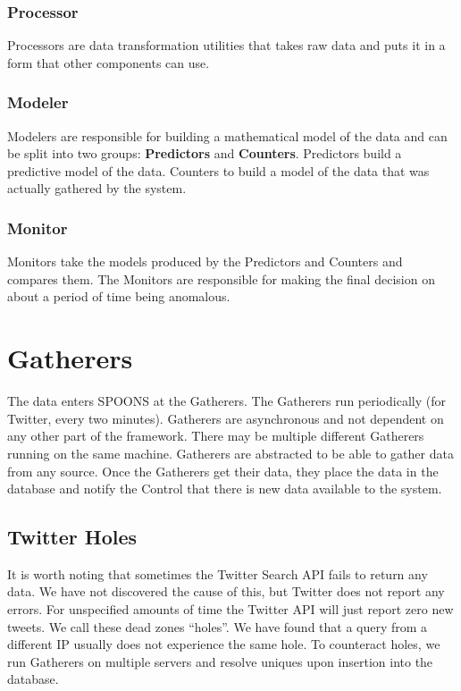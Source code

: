 \documentclass[12pt]{ucthesis}
\begin{document}
\subsubsection{Processor}
Processors are data transformation utilities that takes raw data and puts it in a form that other components can use.

\subsubsection{Modeler}
Modelers are responsible for building a mathematical model of the data and can be split into two groups: \textbf{Predictors} and \textbf{Counters}.
Predictors build a predictive model of the data. Counters to build a model of the data that was actually gathered by the system.

\subsubsection{Monitor}
Monitors take the models produced by the Predictors and Counters and compares them. The Monitors are responsible for
making the final decision on about a period of time being anomalous.

\section{Gatherers}
\label{arch-gatherers}
The data enters SPOONS at the Gatherers. The Gatherers run periodically (for Twitter, every two minutes).
Gatherers are asynchronous and not dependent on any other part of the framework. There may be multiple different
Gatherers running on the same machine. Gatherers are abstracted to be able to gather data from any source.
Once the Gatherers get their data, they place the data in the database and notify the Control that there is new data
available to the system.

\subsection{Twitter Holes}
\label{arch-twitter-holes}
It is worth noting that sometimes the Twitter Search API fails to return any data. We have not discovered the cause
of this, but Twitter does not report any errors. For unspecified amounts of time the Twitter API will just report zero
new tweets. We call these dead zones ``holes''. We have found that a query from a different IP usually does not
experience the same hole. To counteract holes, we run Gatherers on multiple servers and resolve uniques upon insertion
into the database.
\end{document}
